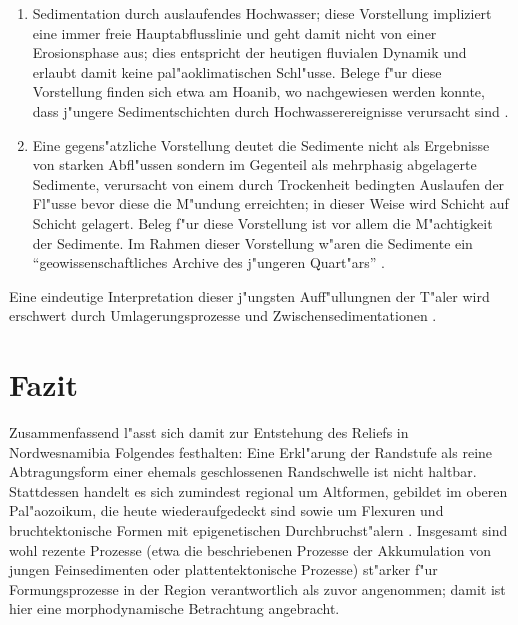 \documentclass[titlepage,a4paper]{scrartcl}
\begin{document}
\begin{enumerate}

\item Sedimentation durch auslaufendes Hochwasser; diese Vorstellung impliziert eine immer freie Hauptabflusslinie und geht damit nicht von einer Erosionsphase aus; dies entspricht der heutigen fluvialen Dynamik und erlaubt damit keine pal"aoklimatischen Schl"usse. Belege f"ur diese Vorstellung finden sich etwa am Hoanib, wo nachgewiesen werden konnte, dass j"ungere Sedimentschichten durch Hochwasserereignisse verursacht sind \citep[93]{HueserEtAl2003}.
\item Eine gegens"atzliche Vorstellung deutet die Sedimente nicht als Ergebnisse von starken Abfl"ussen sondern im Gegenteil als mehrphasig abgelagerte Sedimente, verursacht von einem durch Trockenheit bedingten Auslaufen der Fl"usse bevor diese die M"undung erreichten; in dieser Weise wird Schicht auf Schicht gelagert. Beleg f"ur diese Vorstellung ist vor allem die M"achtigkeit der Sedimente. Im Rahmen dieser Vorstellung w"aren die Sedimente ein ``geowissenschaftliches Archive des j"ungeren Quart"ars'' \citep[93]{HueserEtAl2003}.

\end{enumerate}

Eine eindeutige Interpretation dieser j"ungsten Auff"ullungnen der T"aler wird erschwert durch Umlagerungsprozesse und Zwischensedimentationen \citep{HueserEtAl2003}.

\newpage
\section{Fazit}

Zusammenfassend l"asst sich damit zur Entstehung des Reliefs in Nordwesnamibia Folgendes festhalten: Eine Erkl"arung der Randstufe als reine Abtragungsform einer ehemals geschlossenen Randschwelle \citep{Hueser1989} ist nicht haltbar. Stattdessen handelt es sich zumindest regional um Altformen, gebildet im oberen Pal"aozoikum, die heute wiederaufgedeckt sind \citep{HueserEtAl2003} sowie um Flexuren und bruchtektonische Formen mit epigenetischen Durchbruchst"alern \citep{BrunotteAndSpoenemann1997}. Insgesamt sind wohl rezente Prozesse (etwa die beschriebenen Prozesse der Akkumulation von jungen Feinsedimenten oder plattentektonische Prozesse) st"arker f"ur Formungsprozesse in der Region verantwortlich als zuvor angenommen; damit ist hier eine morphodynamische Betrachtung angebracht.

\newpage
\enlargethispage{5cm}
\linespread{1.0}

 


\thispagestyle{empty}
\end{document}
